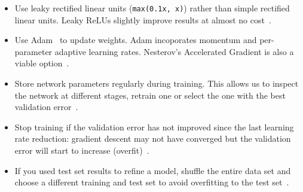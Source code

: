 \begin{itemize}
	\item Use leaky rectified linear units (\texttt{max(0.1x, x)}) rather than simple rectified linear units. Leaky ReLUs slightly improve results at almost no cost~\cite{Xu2015}.

	\item Use Adam~\cite{Kingma2014} to update weights. Adam incoporates momentum and per-parameter adaptive learning rates. Nesterov's Accelerated Gradient is also a viable option~\cite{Karpathy2016}.

	\item Store network parameters regularly during training. This allows us to inspect the network at different stages, retrain one or select the one with the best validation error~\cite{Bengio2014}.

	\item Stop training if the validation error has not improved since the last learning rate reduction: gradient descent may not have converged but the validation error will start to increase (overfit)~\cite{Bengio2012}.

	\item If you used test set results to refine a model, shuffle the entire data set and choose a different training and test set to avoid overfitting to the test set~\cite{Ng2014}.
\end{itemize}


